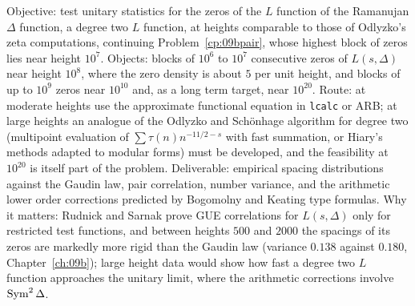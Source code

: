 \begin{compproblem}
Objective: test unitary statistics for the zeros of the $L$ function of the Ramanujan $\Delta$ function, a degree two $L$ function, at heights comparable to those of Odlyzko's zeta computations, continuing Problem~\ref{cp:09bpair}, whose highest block of zeros lies near height $10^7$. Objects: blocks of $10^6$ to $10^7$ consecutive zeros of $L(s,\Delta)$ near height $10^{8}$, where the zero density is about $5$ per unit height, and blocks of up to $10^9$ zeros near $10^{10}$ and, as a long term target, near $10^{20}$. Route: at moderate heights use the approximate functional equation in \texttt{lcalc} or ARB; at large heights an analogue of the Odlyzko and Schönhage algorithm for degree two (multipoint evaluation of $\sum\tau(n)n^{-11/2-s}$ with fast summation, or Hiary's methods adapted to modular forms) must be developed, and the feasibility at $10^{20}$ is itself part of the problem. Deliverable: empirical spacing distributions against the Gaudin law, pair correlation, number variance, and the arithmetic lower order corrections predicted by Bogomolny and Keating type formulas. Why it matters: Rudnick and Sarnak prove GUE correlations for $L(s,\Delta)$ only for restricted test functions, and between heights $500$ and $2000$ the spacings of its zeros are markedly more rigid than the Gaudin law (variance $0.138$ against $0.180$, Chapter~\ref{ch:09b}); large height data would show how fast a degree two $L$ function approaches the unitary limit, where the arithmetic corrections involve $\operatorname{Sym}^2\Delta$.
\end{compproblem}
